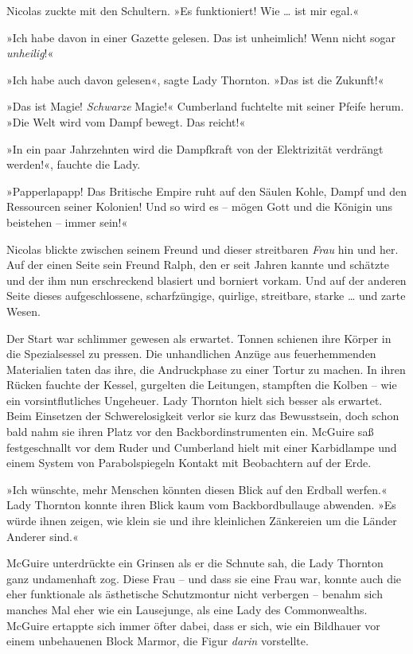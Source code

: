 Nicolas zuckte mit den Schultern. »Es funktioniert! Wie … ist mir
egal.«

»Ich habe davon in einer Gazette gelesen. Das ist unheimlich! Wenn
nicht sogar \emph{unheilig}!«

»Ich habe auch davon gelesen«, sagte Lady Thornton. »Das ist die
Zukunft!«

»Das ist Magie! \emph{Schwarze} Magie!« Cumberland fuchtelte mit
seiner Pfeife herum. »Die Welt wird vom Dampf bewegt. Das reicht!«

»In ein paar Jahrzehnten wird die Dampfkraft von der Elektrizität
verdrängt werden!«, fauchte die Lady.

»Papperlapapp! Das Britische Empire ruht auf den Säulen Kohle,
Dampf und den Ressourcen seiner Kolonien! Und so wird es – mögen
Gott und die Königin uns beistehen – immer sein!«

Nicolas blickte zwischen seinem Freund und dieser streitbaren
\emph{Frau} hin und her. Auf der einen Seite sein Freund Ralph, den
er seit Jahren kannte und schätzte und der ihm nun erschreckend
blasiert und borniert vorkam. Und auf der anderen Seite dieses
aufgeschlossene, scharfzüngige, quirlige, streitbare, starke … und
zarte Wesen.

\tb

Der Start war schlimmer gewesen als erwartet. Tonnen schienen ihre
Körper in die Spezialsessel zu pressen. Die unhandlichen Anzüge aus
feuerhemmenden Materialien taten das ihre, die Andruckphase zu
einer Tortur zu machen. In ihren Rücken fauchte der Kessel,
gurgelten die Leitungen, stampften die Kolben – wie ein
vorsintflutliches Ungeheuer. Lady Thornton hielt sich besser als
erwartet. Beim Einsetzen der Schwerelosigkeit verlor sie kurz das
Bewusstsein, doch schon bald nahm sie ihren Platz vor den
Backbordinstrumenten ein. McGuire saß festgeschnallt vor dem Ruder
und Cumberland hielt mit einer Karbidlampe und einem System von
Parabolspiegeln Kontakt mit Beobachtern auf der Erde.

»Ich wünschte, mehr Menschen könnten diesen Blick auf den Erdball
werfen.« Lady Thornton konnte ihren Blick kaum vom Backbordbullauge
abwenden. »Es würde ihnen zeigen, wie klein sie und ihre
kleinlichen Zänkereien um die Länder Anderer sind.«

McGuire unterdrückte ein Grinsen als er die Schnute sah, die Lady
Thornton ganz undamenhaft zog. Diese Frau – und dass sie eine Frau
war, konnte auch die eher funktionale als ästhetische Schutzmontur
nicht verbergen – benahm sich manches Mal eher wie ein Lausejunge,
als eine Lady des Commonwealths. McGuire ertappte sich immer öfter
dabei, dass er sich, wie ein Bildhauer vor einem unbehauenen Block
Marmor, die Figur \emph{darin} vorstellte.

